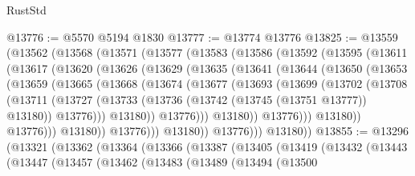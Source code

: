 \begin{lexlean}{RustStd}
\begin{coremodule}
{\begin{coremodule}
{{{{{{{{{{{{{{{{{{{{{{{{{{{{{{{@13776 := @5570 @5194 @1830
@13777 := @13774 @13776
@13825 := @13559
    (@13562
      (@13568
        (@13571
          (@13577
            (@13583
              (@13586
                (@13592
                  (@13595
                    (@13611
                      (@13617
                        (@13620
                          (@13626
                            (@13629
                              (@13635
                                (@13641
                                  (@13644
                                    (@13650
                                      (@13653
                                        (@13659
                                          (@13665
                                            (@13668
                                              (@13674
                                                (@13677
                                                  (@13693
                                                    (@13699
                                                      (@13702
                                                        (@13708
                                                          (@13711
                                                            (@13727
                                                              (@13733
                                                                (@13736
                                                                  (@13742
                                                                    (@13745 (@13751 @13777))
                                                                    @13180))
                                                                @13776)))
                                                          @13180))
                                                      @13776)))
                                                @13180))
                                            @13776)))
                                      @13180))
                                  @13776)))
                            @13180))
                        @13776)))
                  @13180))
              @13776)))
        @13180))
@13855 := @13296
    (@13321
      (@13362
        (@13364
          (@13366
            (@13387
              (@13405
                (@13419
                  (@13432
                    (@13443
                      (@13447
                        (@13457
                          (@13462
                            (@13483
                              (@13489
                                (@13494
                                  (@13500
}}}}}}}}}}}}}}}}}}}}}}}}}}}}}}}
\end{coremodule}}
\end{coremodule}
\end{lexlean}
